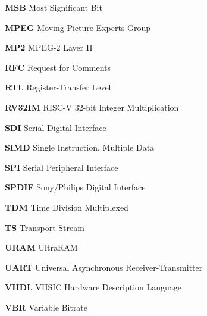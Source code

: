 \begin{description}
    \item \hspace{2mm} \textbf{MSB} Most Significant Bit
    \item \hspace{2mm} \textbf{MPEG} Moving Picture Experts Group
    \item \hspace{2mm} \textbf{MP2} MPEG-2 Layer II
    \item \hspace{2mm} \textbf{RFC} Request for Comments
    \item \hspace{2mm} \textbf{RTL} Register-Transfer Level
    \item \hspace{2mm} \textbf{RV32IM} RISC-V 32-bit Integer Multiplication
    \item \hspace{2mm} \textbf{SDI} Serial Digital Interface
    \item \hspace{2mm} \textbf{SIMD} Single Instruction, Multiple Data
    \item \hspace{2mm} \textbf{SPI} Serial Peripheral Interface
    \item \hspace{2mm} \textbf{SPDIF} Sony/Philips Digital Interface
    \item \hspace{2mm} \textbf{TDM} Time Division Multiplexed
    \item \hspace{2mm} \textbf{TS} Transport Stream
    \item \hspace{2mm} \textbf{URAM} UltraRAM
    \item \hspace{2mm} \textbf{UART} Universal Asynchronous Receiver-Transmitter
    \item \hspace{2mm} \textbf{VHDL} VHSIC Hardware Description Language
    \item \hspace{2mm} \textbf{VBR} Variable Bitrate
\end{description}